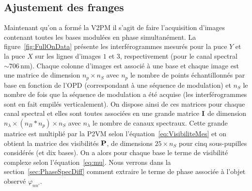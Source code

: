 \subsection{Ajustement des franges}

Maintenant qu'on a formé la \ac{V2PM} il s'agit de faire l'acquisition d'images contenant toutes les bases modulées en phase simultanément. La figure~\ref{fig:FullOnData} présente les interférogrammes mesurés pour la puce $Y$ et la puce $X$ sur les lignes d'images $1$ et $3$, respectivement (pour le canal spectral $\sim 706 \,$nm). Chaque colonne d'images est associé à une base et chaque image est une matrice de dimension $n_p \times n_S$ avec $n_p$ le nombre de points échantillonnés par base en fonction de l'\ac{OPD} (correspondant à une séquence de modulation) et $n_S$ le nombre de fois que la séquence de modulation a été acquise (les interférogrammes sont en fait empilés verticalement). On dispose ainsi de ces matrices pour chaque canal spectral et elles sont toutes associées en une grande matrice $\text{\textbf{I}}$ de dimension $n_{\lambda} \times (n_B*n_p) \times n_S$ avec $n_{\lambda}$ le nombre de canaux spectraux. Cette grande matrice est multiplié par la \ac{P2VM} selon l'équation~\ref{eq:VisibiliteMes} et on obtient la matrice des visibilités $\text{\textbf{P}}$, de dimensions $25 \times n_S$ pour cinq sous-pupilles considérés (et dix bases). On a alors pour chaque base le terme de visibilité complexe selon l'équation~\ref{eq:mu}. Nous verrons dans la section~\ref{sec:PhaseSpecDiff} comment extraire le terme de phase associée à l'objet observé $\varphi_{nn'}$.

